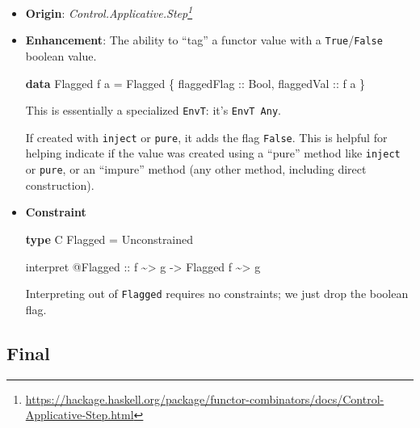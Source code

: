 \documentclass[]{article}
\newenvironment{Shaded}{}{}
\newcommand{\DataTypeTok}[1]{\textcolor[rgb]{0.56,0.13,0.00}{#1}}
\newcommand{\KeywordTok}[1]{\textcolor[rgb]{0.00,0.44,0.13}{\textbf{#1}}}
\newcommand{\NormalTok}[1]{#1}
\newcommand{\OperatorTok}[1]{\textcolor[rgb]{0.40,0.40,0.40}{#1}}
\newcommand{\OtherTok}[1]{\textcolor[rgb]{0.00,0.44,0.13}{#1}}
\renewcommand{\href}[2]{#2\footnote{\url{#1}}}
\begin{document}
\begin{itemize}
\item
  \textbf{Origin}:
  \emph{\href{https://hackage.haskell.org/package/functor-combinators/docs/Control-Applicative-Step.html}{Control.Applicative.Step}}
\item
  \textbf{Enhancement}: The ability to ``tag'' a functor value with a
  \texttt{True}/\texttt{False} boolean value.

\begin{Shaded}
\begin{Highlighting}[]
\KeywordTok{data} \DataTypeTok{Flagged}\NormalTok{ f a }\OtherTok{=} \DataTypeTok{Flagged}\NormalTok{ \{}\OtherTok{ flaggedFlag ::} \DataTypeTok{Bool}\NormalTok{,}\OtherTok{ flaggedVal ::}\NormalTok{ f a \}}
\end{Highlighting}
\end{Shaded}

  This is essentially a specialized \texttt{EnvT}: it's \texttt{EnvT\ Any}.

  If created with \texttt{inject} or \texttt{pure}, it adds the flag
  \texttt{False}. This is helpful for helping indicate if the value was created
  using a ``pure'' method like \texttt{inject} or \texttt{pure}, or an
  ``impure'' method (any other method, including direct construction).
\item
  \textbf{Constraint}

\begin{Shaded}
\begin{Highlighting}[]
\KeywordTok{type} \DataTypeTok{C} \DataTypeTok{Flagged} \OtherTok{=} \DataTypeTok{Unconstrained}

\NormalTok{interpret }\OperatorTok{@}\DataTypeTok{Flagged}
\OtherTok{    ::}\NormalTok{ f }\OperatorTok{\textasciitilde{}>}\NormalTok{ g}
    \OtherTok{{-}>} \DataTypeTok{Flagged}\NormalTok{ f }\OperatorTok{\textasciitilde{}>}\NormalTok{ g}
\end{Highlighting}
\end{Shaded}

  Interpreting out of \texttt{Flagged} requires no constraints; we just drop the
  boolean flag.
\end{itemize}

\hypertarget{final}{%
\subsection{Final}\label{final}}
\end{document}
